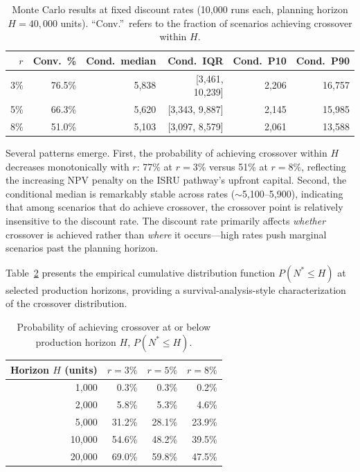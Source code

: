 \documentclass[preprint,12pt]{elsarticle}
\begin{document}
\begin{table}[htbp]
\centering
\caption{Monte Carlo results at fixed discount rates (10{,}000 runs each, planning horizon $H = 40{,}000$ units). ``Conv.''\ refers to the fraction of scenarios achieving crossover within $H$.}
\label{tab:mc_summary}
\small
\begin{tabular}{@{}rrrrrr@{}}
\toprule
$r$ & Conv.\ \% & Cond.\ median & Cond.\ IQR & Cond.\ P10 & Cond.\ P90 \\
\midrule
3\%  & 76.5\% & 5{,}838 & [3{,}461, 10{,}239] & 2{,}206 & 16{,}757 \\
5\%  & 66.3\% & 5{,}620 & [3{,}343, 9{,}887]  & 2{,}145 & 15{,}985 \\
8\%  & 51.0\% & 5{,}103 & [3{,}097, 8{,}579]  & 2{,}061 & 13{,}588 \\
\bottomrule
\end{tabular}
\end{table}

Several patterns emerge. First, the probability of achieving crossover within $H$ decreases monotonically with $r$: 77\% at $r = 3\%$ versus 51\% at $r = 8\%$, reflecting the increasing NPV penalty on the ISRU pathway's upfront capital. Second, the conditional median is remarkably stable across rates ($\sim$5{,}100--5{,}900), indicating that among scenarios that do achieve crossover, the crossover point is relatively insensitive to the discount rate. The discount rate primarily affects \emph{whether} crossover is achieved rather than \emph{where} it occurs---high rates push marginal scenarios past the planning horizon.

Table~\ref{tab:convergence} presents the empirical cumulative distribution function $P(N^* \leq H)$ at selected production horizons, providing a survival-analysis-style characterization of the crossover distribution.

\begin{table}[htbp]
\centering
\caption{Probability of achieving crossover at or below production horizon $H$, $P(N^* \leq H)$.}
\label{tab:convergence}
\small
\begin{tabular}{@{}rrrr@{}}
\toprule
Horizon $H$ (units) & $r = 3\%$ & $r = 5\%$ & $r = 8\%$ \\
\midrule
1{,}000  & 0.3\% & 0.3\% & 0.2\% \\
2{,}000  & 5.8\% & 5.3\% & 4.6\% \\
5{,}000  & 31.2\% & 28.1\% & 23.9\% \\
10{,}000 & 54.6\% & 48.2\% & 39.5\% \\
20{,}000 & 69.0\% & 59.8\% & 47.5\% \\
\bottomrule
\end{tabular}
\end{table}
\end{document}
